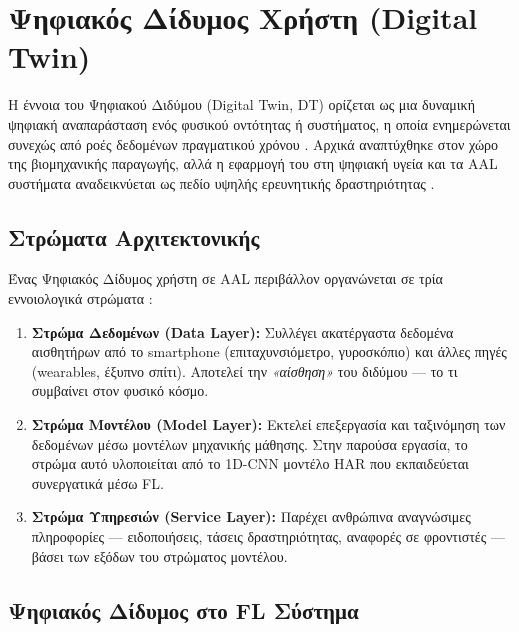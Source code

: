 
\section{Ψηφιακός Δίδυμος Χρήστη (Digital Twin)}
\label{sec:digital_twin}

Η έννοια του Ψηφιακού Διδύμου (Digital Twin, DT) ορίζεται ως μια
δυναμική ψηφιακή αναπαράσταση ενός φυσικού οντότητας ή συστήματος,
η οποία ενημερώνεται συνεχώς από ροές δεδομένων πραγματικού χρόνου
\cite{Grieves2014}. Αρχικά αναπτύχθηκε στον χώρο της βιομηχανικής
παραγωγής, αλλά η εφαρμογή του στη ψηφιακή υγεία και τα AAL
συστήματα αναδεικνύεται ως πεδίο υψηλής ερευνητικής δραστηριότητας
\cite{Tao2019}.

\subsection{Στρώματα Αρχιτεκτονικής}
\label{subsec:dt_layers}

Ένας Ψηφιακός Δίδυμος χρήστη σε AAL περιβάλλον οργανώνεται σε τρία
εννοιολογικά στρώματα \cite{LiuDT2021}:

\begin{enumerate}
    \item \textbf{Στρώμα Δεδομένων (Data Layer):} Συλλέγει ακατέργαστα
    δεδομένα αισθητήρων από το smartphone (επιταχυνσιόμετρο, γυροσκόπιο)
    και άλλες πηγές (wearables, έξυπνο σπίτι). Αποτελεί την \textit{«αίσθηση»}
    του διδύμου — το τι συμβαίνει στον φυσικό κόσμο.

    \item \textbf{Στρώμα Μοντέλου (Model Layer):} Εκτελεί επεξεργασία
    και ταξινόμηση των δεδομένων μέσω μοντέλων μηχανικής μάθησης.
    Στην παρούσα εργασία, το στρώμα αυτό υλοποιείται από το 1D-CNN
    μοντέλο HAR που εκπαιδεύεται συνεργατικά μέσω FL.

    \item \textbf{Στρώμα Υπηρεσιών (Service Layer):} Παρέχει ανθρώπινα
    αναγνώσιμες πληροφορίες — ειδοποιήσεις, τάσεις δραστηριότητας,
    αναφορές σε φροντιστές — βάσει των εξόδων του στρώματος μοντέλου.
\end{enumerate}

\subsection{Ψηφιακός Δίδυμος στο FL Σύστημα}
\label{subsec:dt_in_fl}


